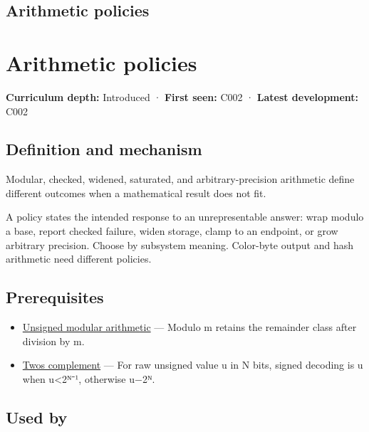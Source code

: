 \hypertarget{appendix-2ed044358b82}{}
\section*{Arithmetic policies}
\chapter{Arithmetic policies}\label{appendix-2ed044358b82-arithmetic-policies}

\textbf{Curriculum depth:} Introduced · \textbf{First seen:} C002 · \textbf{Latest development:} C002

\section{Definition and mechanism}\label{appendix-2ed044358b82-definition-and-mechanism}

Modular, checked, widened, saturated, and arbitrary-precision arithmetic define different outcomes when a mathematical result does not fit.

A policy states the intended response to an unrepresentable answer: wrap modulo a base, report checked failure, widen storage, clamp to an endpoint, or grow arbitrary precision. Choose by subsystem meaning. Color-byte output and hash arithmetic need different policies.

\section{Prerequisites}\label{appendix-2ed044358b82-prerequisites}

\begin{itemize}
\tightlist
\item
  \hyperref[appendix-c99977d88b33]{Unsigned modular arithmetic} --- Modulo m retains the remainder class after division by m.
\item
  \hyperref[appendix-4fbc03d20829]{Two\textquotesingle s complement} --- For raw unsigned value u in N bits, signed decoding is u when u\textless2ᴺ⁻¹, otherwise u−2ᴺ.
\end{itemize}

\section{Used by}\label{appendix-2ed044358b82-used-by}


